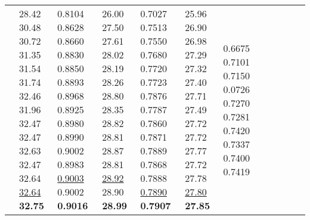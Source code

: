 \documentclass[runningheads]{llncs}
\begin{document}
\begin{table}[!ht]
\begin{tabular}{|p{7em}|p{2.5em}|p{2.5em}|p{3em}|p{2.5em}|p{3em}|p{2.5em}|p{3em}|p{2.5em}|p{3em}|p{2.5em}|p{3em}|}
		 \newline{} \newline{} \newline{} \newline{} \newline{} \newline{} \newline{} \newline{} \newline{} \newline{} \newline{} \newline{} \newline{} \newline{}  & 28.42 \newline{}30.48 \newline{}30.72 \newline{}31.35 \newline{}31.54 \newline{}31.74 \newline{}32.46 \newline{}31.96 \newline{}32.47 \newline{}32.47 \newline{}32.63 \newline{}32.47 \newline{}32.64 \newline{}\underline{32.64} \newline{}\bfseries{32.75} & 0.8104 \newline{}0.8628 \newline{}0.8660 \newline{}0.8830 \newline{}0.8850 \newline{}0.8893 \newline{}0.8968 \newline{}0.8925 \newline{}0.8980 \newline{}0.8990 \newline{}0.9002 \newline{}0.8983 \newline{}\underline{0.9003} \newline{}0.9002 \newline{}\bfseries{0.9016} & 26.00 \newline{}27.50 \newline{}27.61 \newline{}28.02 \newline{}28.19 \newline{}28.26 \newline{}28.80 \newline{}28.35 \newline{}28.82 \newline{}28.81 \newline{}28.87 \newline{}28.81 \newline{}\underline{28.92} \newline{}28.90 \newline{}\bfseries{28.99} & 0.7027 \newline{}0.7513 \newline{}0.7550 \newline{}0.7680 \newline{}0.7720 \newline{}0.7723 \newline{}0.7876 \newline{}0.7787 \newline{}0.7860 \newline{}0.7871 \newline{}0.7889 \newline{}0.7868 \newline{}0.7888 \newline{}\underline{0.7890} \newline{}\bfseries{0.7907} & 25.96 \newline{}26.90 \newline{}26.98 \newline{}27.29 \newline{}27.32 \newline{}27.40 \newline{}27.71 \newline{}27.49 \newline{}27.72 \newline{}27.72 \newline{}27.77 \newline{}27.72 \newline{}27.78 \newline{}\underline{27.80} \newline{}\bfseries{27.85} & 0.6675 \newline{}0.7101 \newline{}0.7150 \newline{}0.0726 \newline{}0.7270 \newline{}0.7281 \newline{}0.7420 \newline{}0.7337 \newline{}0.7400 \newline{}0.7419 \newline
\end{tabular}
\end{table}
\end{document}
